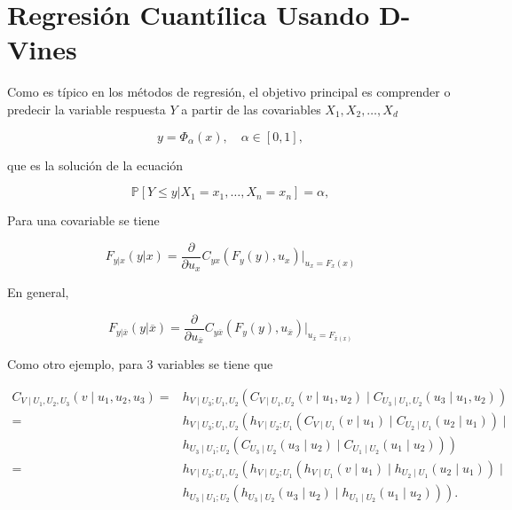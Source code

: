 \section{Regresión Cuantílica Usando D-Vines}

Como es típico en los métodos de regresión, el objetivo principal es comprender o predecir la variable respuesta $Y$ a partir de las covariables $X_1, X_2, \dots , X_d$

\begin{equation}\label{regresion}
    y = \Phi_{\alpha}(x), \quad \alpha \in [0, 1],
\end{equation}

que es la solución de la ecuación 

\begin{equation}
     \mathbb{P}[Y \leq y | X_1 = x_1, \dots, X_n = x_n ] = \alpha,
\end{equation}

Para una covariable se tiene

\begin{equation}
    F_{y|x}(y|x) = \frac{\partial }{\partial u_x} C_{yx}(F_y(y), u_x) \Big|_{u_x = F_x(x)}  
\end{equation}

En general, 

\begin{equation}
    F_{y|\overline{x}}(y|\overline{x}) = \frac{\partial }{\partial u_{\overline{x}}} C_{y\overline{x}}(F_y(y), u_{\overline{x}}) \Big|_{u_{\overline{x}} =F_{\overline{x}(x)}} 
\end{equation}

Como otro ejemplo, para $3$ variables se tiene que 

\begin{equation}
    \begin{aligned}
    C_{V \mid U_1, U_2, U_3}\left(v \mid u_1, u_2, u_3\right) 
    = & h_{V \mid U_3 ; U_1, U_2}\left(C_{V \mid U_1, U_2}\left(v \mid u_1, u_2\right) \mid C_{U_3 \mid U_1, U_2}\left(u_3 \mid u_1, u_2\right)\right) \\
    = & h_{V \mid U_3 ; U_1, U_2}\left(h_{V \mid U_2 ; U_1}\left(C_{V \mid U_1}\left(v \mid u_1\right) \mid C_{U_2 \mid U_1}\left(u_2 \mid u_1\right)\right) \mid\right. \\
    & \left.h_{U_3 \mid U_1 ; U_2}\left(C_{U_3 \mid U_2}\left(u_3 \mid u_2\right) \mid C_{U_1 \mid U_2}\left(u_1 \mid u_2\right)\right)\right) \\ 
    = & h_{V \mid U_3 ; U_1, U_2}\left(h_{V \mid U_2 ; U_1}\left(h_{V \mid U_1}\left(v \mid u_1\right) \mid h_{U_2 \mid U_1}\left(u_2 \mid u_1\right)\right) \mid\right. \\
    & \left.h_{U_3 \mid U_1 ; U_2}\left(h_{U_3 \mid U_2}\left(u_3 \mid u_2\right) \mid h_{U_1 \mid U_2}\left(u_1 \mid u_2\right)\right)\right).
    \end{aligned}
\end{equation}

